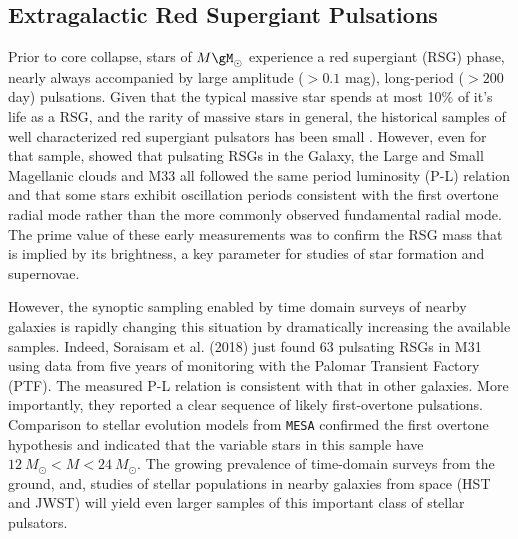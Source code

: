 {\color{green}
\subsection{Extragalactic Red Supergiant Pulsations}
}


Prior to core collapse, stars of $M \gM_\odot$ experience a red
supergiant (RSG) phase, nearly always accompanied by large amplitude
($>0.1$ mag), long-period ($>200 $ day) pulsations.  Given that the
typical massive star spends at most 10$\%$ of it's life as a RSG, and
the rarity of massive stars in general, the historical samples of well
characterized red supergiant pulsators has been small \citep[see][for a nice compilation]{Yang_2012}. However, even for
that sample, \citet{Yang_2012} showed that pulsating RSGs in the
Galaxy, the Large and Small Magellanic clouds and M33 all followed the
same period luminosity (P-L) relation and that some stars exhibit
oscillation periods consistent with the first overtone radial mode
rather than the more commonly observed fundamental radial mode. The
prime value of these early measurements was to confirm the RSG mass
that is implied by its brightness, a key parameter for studies of star
formation and supernovae.

However, the synoptic sampling enabled by time domain surveys of
nearby galaxies is rapidly changing this situation by dramatically
increasing the available samples. Indeed, Soraisam et al. (2018) just
found 63 pulsating RSGs in M31 using data from five years of
monitoring with the Palomar Transient Factory (PTF). The measured P-L
relation is consistent with that in other galaxies. More importantly,
they reported a clear sequence of likely first-overtone
pulsations. Comparison to stellar evolution models from \texttt{MESA}
confirmed the first overtone hypothesis and indicated that the
variable stars in this sample have $12~M_{\odot}<M<24~M_{\odot}$. The growing prevalence of 
time-domain surveys from the ground, and, studies 
of stellar populations in nearby galaxies from space (HST and JWST) 
will yield even larger samples of this important class of stellar pulsators. 